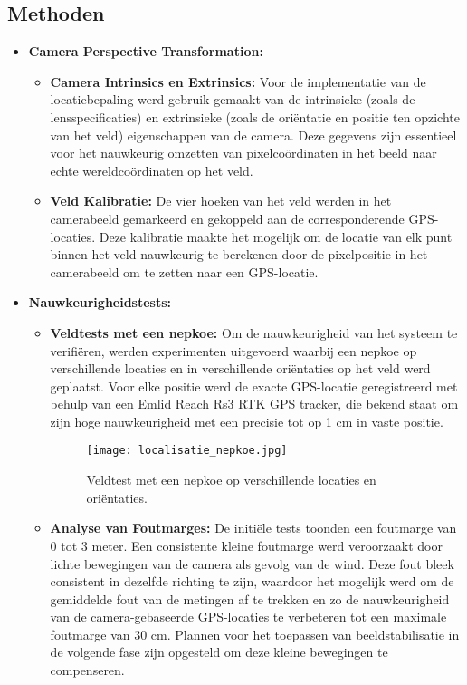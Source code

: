 \subsection{Methoden}
\begin{itemize}
  \item \textbf{Camera Perspective Transformation:}
  \begin{itemize}
    \item \textbf{Camera Intrinsics en Extrinsics:} Voor de implementatie van de locatiebepaling werd gebruik gemaakt van de intrinsieke (zoals de lensspecificaties) en extrinsieke (zoals de oriëntatie en positie ten opzichte van het veld) eigenschappen van de camera. Deze gegevens zijn essentieel voor het nauwkeurig omzetten van pixelcoördinaten in het beeld naar echte wereldcoördinaten op het veld.
    \item \textbf{Veld Kalibratie:} De vier hoeken van het veld werden in het camerabeeld gemarkeerd en gekoppeld aan de corresponderende GPS-locaties. Deze kalibratie maakte het mogelijk om de locatie van elk punt binnen het veld nauwkeurig te berekenen door de pixelpositie in het camerabeeld om te zetten naar een GPS-locatie.
  \end{itemize}
  \item \textbf{Nauwkeurigheidstests:}
  \begin{itemize}
    \item \textbf{Veldtests met een nepkoe:} Om de nauwkeurigheid van het systeem te verifiëren, werden experimenten uitgevoerd waarbij een nepkoe op verschillende locaties en in verschillende oriëntaties op het veld werd geplaatst. Voor elke positie werd de exacte GPS-locatie geregistreerd met behulp van een Emlid Reach Rs3 RTK GPS tracker, die bekend staat om zijn hoge nauwkeurigheid met een precisie tot op 1 cm in vaste positie.
    \newline 
    \begin{figure}[H]
      \centering
      \texttt{[image: localisatie\_nepkoe.jpg]}
      \caption{Veldtest met een nepkoe op verschillende locaties en oriëntaties.}
      \label{fig:localisatie_nepkoe}  
    \end{figure}
    \newline 
    \item \textbf{Analyse van Foutmarges:} De initiële tests toonden een foutmarge van 0 tot 3 meter. Een consistente kleine foutmarge werd veroorzaakt door lichte bewegingen van de camera als gevolg van de wind. Deze fout bleek consistent in dezelfde richting te zijn, waardoor het mogelijk werd om de gemiddelde fout van de metingen af te trekken en zo de nauwkeurigheid van de camera-gebaseerde GPS-locaties te verbeteren tot een maximale foutmarge van 30 cm. Plannen voor het toepassen van beeldstabilisatie in de volgende fase zijn opgesteld om deze kleine bewegingen te compenseren.

\end{itemize}
\end{itemize}
